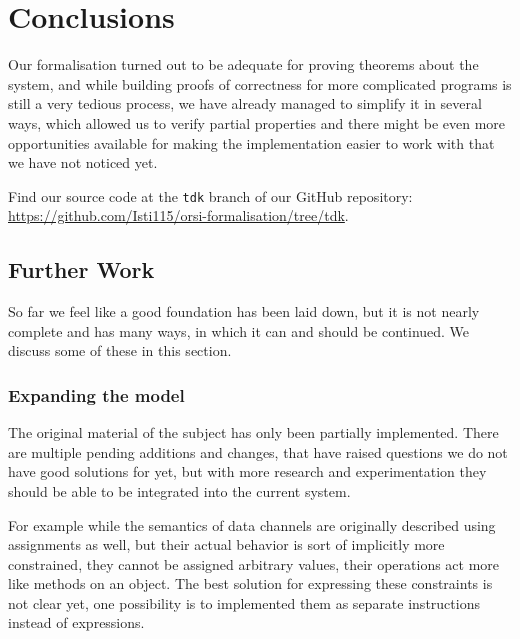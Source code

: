 \chapter{Conclusions}
\label{chp:conclusions}

Our formalisation turned out to be adequate for proving theorems about the system, and while building proofs of correctness for more complicated programs is still a very tedious process, we have already managed to simplify it in several ways, which allowed us to verify partial properties and there might be even more opportunities available for making the implementation easier to work with that we have not noticed yet.

Find our source code at the \verb|tdk| branch of our GitHub repository: \url{https://github.com/Isti115/orsi-formalisation/tree/tdk}.

\section{Further Work}

So far we feel like a good foundation has been laid down, but it is not nearly complete and has many ways, in which it can and should be continued. We discuss some of these in this section.

\subsection{Expanding the model}

The original material of the subject has only been partially implemented. There are multiple pending additions and changes, that have raised questions we do not have good solutions for yet, but with more research and experimentation they should be able to be integrated into the current system.

For example while the semantics of data channels are originally described using assignments as well, but their actual behavior is sort of implicitly more constrained, they cannot be assigned arbitrary values, their operations act more like methods on an object. The best solution for expressing these constraints is not clear yet, one possibility is to implemented them as separate instructions instead of expressions.

